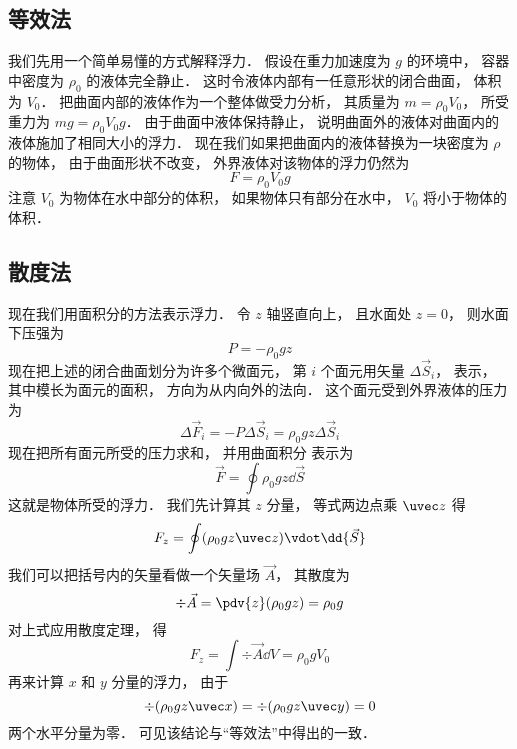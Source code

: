
\subsection{等效法}

我们先用一个简单易懂的方式解释浮力． 假设在重力加速度为 $g$ 的环境中， 容器中密度为 $\rho_0$ 的液体完全静止． 这时令液体内部有一任意形状的闭合曲面， 体积为 $V_0$． 把曲面内部的液体作为一个整体做受力分析， 其质量为 $m = \rho_0 V_0$， 所受重力为 $mg = \rho_0 V_0 g$． 由于曲面中液体保持静止， 说明曲面外的液体对曲面内的液体施加了相同大小的浮力． 现在我们如果把曲面内的液体替换为一块密度为 $\rho$ 的物体， 由于曲面形状不改变， 外界液体对该物体的浮力仍然为
\begin{equation}
F = \rho_0 V_0 g
\end{equation}
注意 $V_0$ 为物体在水中部分的体积， 如果物体只有部分在水中， $V_0$ 将小于物体的体积．

\subsection{散度法}

现在我们用面积分的方法表示浮力． 令 $z$ 轴竖直向上， 且水面处 $z = 0$， 则水面下压强为
\begin{equation}
P = -\rho_0 g z
\end{equation}
现在把上述的闭合曲面划分为许多个微面元， 第 $i$ 个面元用矢量 $\Delta \vec S_i$， 表示， 其中模长为面元的面积， 方向为从内向外的法向． 这个面元受到外界液体的压力为
\begin{equation}
\Delta \vec F_i = -P\Delta \vec S_i = \rho_0 g z \Delta \vec S_i
\end{equation}
现在把所有面元所受的压力求和， 并用曲面积分%
表示为
\begin{equation}
\vec F = \oint \rho_0 g z \dd{\vec S}
\end{equation}
这就是物体所受的浮力． 我们先计算其 $z$ 分量， 等式两边点乘 $\uvec z$ 得
\begin{equation}
F_z = \oint (\rho_0 g z \uvec z)\vdot \dd{\vec S}
\end{equation}
我们可以把括号内的矢量看做一个矢量场 $\vec A$， 其散度为
\begin{equation}
\div \vec A = \pdv{z}(\rho_0 g z) = \rho_0 g
\end{equation}
对上式应用散度定理， 得
\begin{equation}
F_z = \int \div\vec A \dd{V} = \rho_0 g V_0
\end{equation}
再来计算 $x$ 和 $y$ 分量的浮力， 由于
\begin{equation}
\div (\rho_0 g z\uvec x) = \div (\rho_0 g z\uvec y) = 0
\end{equation}
两个水平分量为零． 可见该结论与“等效法”中得出的一致．


